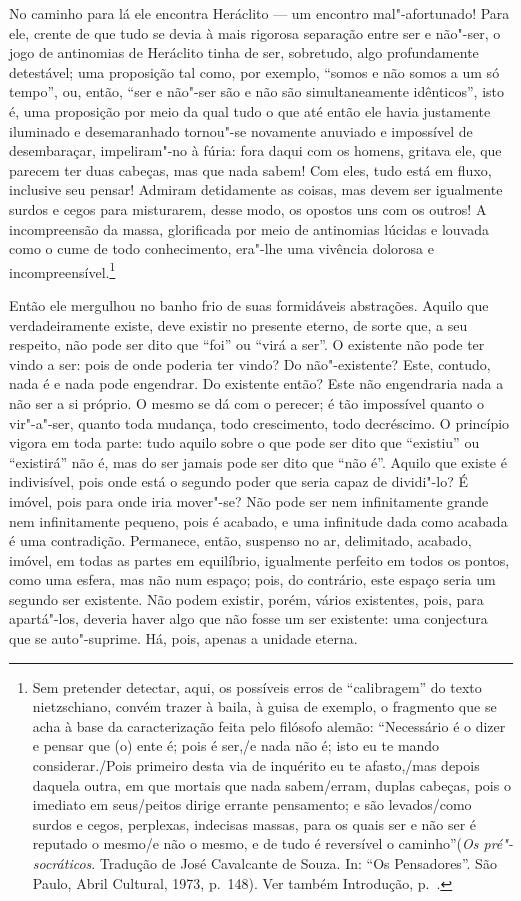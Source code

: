 No caminho para lá ele encontra Heráclito --- um encontro mal"-afortunado! Para
ele, crente de que tudo se devia à mais rigorosa separação entre ser e
não"-ser, o jogo de antinomias de Heráclito tinha de ser, sobretudo, algo
profundamente detestável; uma proposição tal como, por exemplo, ``somos e não
somos a um só tempo'', ou, então, ``ser e não"-ser são e não são
simultaneamente idênticos'', isto é, uma proposição por meio da qual tudo o
que até então ele havia justamente iluminado e desemaranhado tornou"-se
novamente anuviado e impossível de desembaraçar, impeliram"-no à fúria: fora
daqui com os homens, gritava ele, que parecem ter duas cabeças, mas que nada
sabem! Com eles, tudo está em fluxo, inclusive seu pensar! Admiram
detidamente as coisas, mas devem ser igualmente surdos e cegos para
misturarem, desse modo, os opostos uns com os outros! A incompreensão da
massa, glorificada por meio de antinomias lúcidas e louvada como o cume de
todo conhecimento, era"-lhe uma vivência dolorosa e incompreensível.\footnote
{ Sem pretender detectar, aqui, os possíveis erros de ``calibragem'' do texto
nietzschiano, convém trazer à baila, à guisa de exemplo, o fragmento que se
acha à base da caracterização feita pelo filósofo alemão: ``Necessário é o
dizer e pensar que (o) ente é; pois é ser,/e nada não é; isto eu te mando
considerar./Pois primeiro desta via de inquérito eu te afasto,/mas depois
daquela outra, em que mortais que nada sabem/erram, duplas cabeças, pois o
imediato em seus/peitos dirige errante pensamento; e são levados/como surdos
e cegos, perplexas, indecisas massas, para os quais ser e não ser é reputado
o mesmo/e não o mesmo, e de tudo é reversível o caminho''(\textit{Os pré"-socráticos}. 
Tradução de José Cavalcante de Souza. In: ``Os
Pensadores''. São Paulo, Abril Cultural, 1973, p.~148). Ver também
Introdução, p.~\pageref{colli}.}

Então ele mergulhou no banho frio de suas formidáveis abstrações. Aquilo que
verdadeiramente existe, deve existir no presente eterno, de sorte que, a seu
respeito, não pode ser dito que ``foi'' ou ``virá a ser''. O existente não
pode ter vindo a ser: pois de onde poderia ter vindo? Do não"-existente?
Este, contudo, nada é e nada pode engendrar. Do existente então? Este não
engendraria nada a não ser a si próprio. O mesmo se dá com o perecer; é tão
impossível quanto o vir"-a"-ser, quanto toda mudança, todo crescimento, todo
decréscimo. O princípio vigora em toda parte: tudo aquilo sobre o que pode
ser dito que ``existiu'' ou ``existirá'' não é, mas do ser jamais pode ser
dito que ``não é''. Aquilo que existe é indivisível, pois onde está o segundo
poder que seria capaz de dividi"-lo? É imóvel, pois para onde iria mover"-se?
Não pode ser nem infinitamente grande nem infinitamente pequeno, pois é
acabado, e uma infinitude dada como acabada é uma contradição. Permanece,
então, suspenso no ar, delimitado, acabado, imóvel, em todas as partes em
equilíbrio, igualmente perfeito em todos os pontos, como uma esfera, mas não
num espaço; pois, do contrário, este espaço seria um segundo ser existente.
Não podem existir, porém, vários existentes, pois, para apartá"-los, deveria
haver algo que não fosse um ser existente: uma conjectura que se
auto"-suprime. Há, pois, apenas a unidade eterna.

